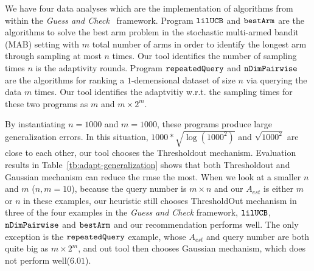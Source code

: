 We have four data analyses which are the implementation of algorithms from~\cite{Jamieson2015TheAO} within the \emph{Guess and Check}~\cite{RogersRSSTW20} framework.
Program $\mathtt{lilUCB}$ and $\mathtt{bestArm}$ are the algorithms to solve the best arm problem in the stochastic multi-armed bandit (MAB) setting
with $m$ total number of arms in order to identify the longest arm through sampling at most $n$ times.
Our tool identifies the number of sampling times $n$ is the adaptivity rounds.
Program $\mathtt{repeatedQuery}$ and $\mathtt{nDimPairwise}$ are the algorithms for ranking
a $1$-demensional dataset of size $n$ via querying the data $m$ times.
Our tool identifies the adaptvitiy w.r.t. the sampling times for these two programs as $m$ and $m \times 2^m$.


By instantiating $n = 1000$ and $m = 1000$, these programs produce large generalization errors.
In this situation, $1000* \sqrt{\log(1000^2)}$ and $\sqrt{1000^2}$ are close to each other,
our tool chooses the Thresholdout mechanism.
Evaluation results in Table~\ref{tb:adapt-generalization} shows that both Thresholdout and Gaussian mechanism can reduce the rmse the most.
When we look at a smaller $n$ and $m$ ($n,m=10$), because the query number is $m \times n$ and our $A_{est}$ is either $m$ or $n$ in these examples,
our heuristic still chooses ThresholdOut mechanism in three of the four examples in the \emph{Guess and Check} framework, $\mathtt{lilUCB}$, $\mathtt{nDimPairwise}$ and $\mathtt{bestArm}$ and our recommendation performs well. The only
exception is the $\mathtt{repeatedQuery}$ example, whose $A_{est}$ and query number are both quite big as $m \times 2^m$, and out tool
then chooses Gaussian mechanism, which does not perform well($6.01$).


